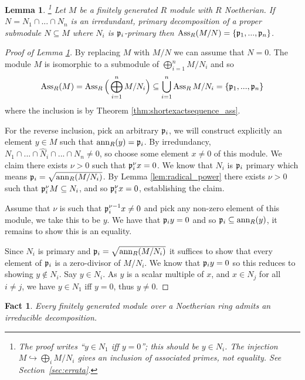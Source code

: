 \documentclass[12pt]{article}
\theoremstyle{plain}
\newtheorem{lemma}[thm]{Lemma}
\newtheorem{fact}[thm]{Fact}
\theoremstyle{definition}
\begin{document}
\begin{lemma}
\label{lem:irred_primary_ass}\footnote{The proof writes ``$y\in N_1$ iff $y=0$''; this should be $y\in N_i$. The injection $M\hookrightarrow\bigoplus_i M/N_i$ gives an inclusion of associated primes, not equality. See Section~\ref{sec:errata}.} Let $M$ be a finitely generated $R$ module with $R$ Noetherian. If $N = N_1 \cap ... \cap N_n$ is an irredundant, primary decomposition of a proper submodule $N \subseteq M$ where $N_i$ is $\frak{p}_i$-primary then $\operatorname{Ass}_R(M/N) = \lbrace \frak{p}_1,...,\frak{p}_n\rbrace$.
\end{lemma}
\begin{proof}[Proof of Lemma \ref{lem:irred_primary_ass}]
By replacing $M$ with $M/N$ we can assume that $N = 0$. The module $M$ is isomorphic to a submodule of $\bigoplus_{i = 1}^nM/N_i$ and so
\[\operatorname{Ass}_R(M) = \operatorname{Ass}_R\Big(\bigoplus_{i = 1}^nM/N_i\Big) \subseteq \bigcup_{i = 1}^n \operatorname{Ass}_RM/N_i = \lbrace \frak{p}_1,...,\frak{p}_n\rbrace\]
where the inclusion is by Theorem \ref{thm:shortexactsequence_ass}.

For the reverse inclusion, pick an arbitrary $\frak{p}_i$, we will construct explicitly an element $y\in M$ such that $\operatorname{ann}_R(y) = \frak{p}_i$. By irredundancy, $N_1 \cap ... \cap \hat{N}_i \cap ... \cap N_n \neq 0$, so choose some element $x \neq 0$ of this module. We claim there exists $\nu > 0$ such that $\frak{p}_i^\nu x = 0$. We know that $N_i$ is $\frak{p}_i$ primary which means $\frak{p}_i = \sqrt{\operatorname{ann}_R(M/N_i)}$. By Lemma \ref{lem:radical_power} there exists $\nu > 0$ such that $\frak{p}_i^\nu M \subseteq N_i$, and so $\frak{p}_i^{\nu}x = 0$, establishing the claim.

Assume that $\nu$ is such that $\frak{p}_i^{\nu - 1}x \neq 0$ and pick any non-zero element of this module, we take this to be $y$. We have that $\frak{p}_iy = 0$ and so $\frak{p}_i \subseteq \operatorname{ann}_R(y)$, it remains to show this is an equality.

Since $N_i$ is primary and $\frak{p}_i = \sqrt{\operatorname{ann}_R(M/N_i)}$ it suffices to show that every element of $\frak{p}_i$ is a zero-divisor of $M/N_i$. We know that $\frak{p}_i y = 0$ so this reduces to showing $y \not\in N_i$. Say $y \in N_i$. As $y$ is a scalar multiple of $x$, and $x \in N_j$ for all $i \neq j$, we have $y \in N_1$ iff $y = 0$, thus $y \neq 0$.
\end{proof}
\begin{fact}
\label{fact:irreducible_decomp} Every finitely generated module over a Noetherian ring admits an irreducible decomposition.
\end{fact}
\end{document}
